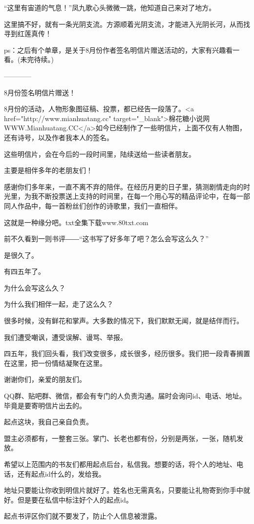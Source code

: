 \begin{this_body}
“这里有宙道的气息！”凤九歌心头微微一跳，他知道自己来对了地方。

这里搞不好，就有一条光阴支流。方源顺着光阴支流，才能进入光阴长河，从而找寻到红莲真传！

ps：之后有个单章，是关于8月份作者签名明信片赠送活动的，大家有兴趣看一看。(未完待续。)

------------

8月份签名明信片赠送！

8月份的活动，人物形象图征稿、投票，都已经告一段落了。<a href="http://www.mianhuatang.cc" target="\_blank">棉花糖小说网WWW.Mianhuatang.CC</a>如今已经制作了一些明信片，上面不仅有人物图，还有诗号，以及作者我本人的签名。

这些明信片，会在今后的一段时间里，陆续送给一些读者朋友。

主要是相伴多年的老朋友们！

感谢你们多年来，一直不离不弃的陪伴。在经历月更的日子里，猜测剧情走向的时光里，为我不断投票送上支持的时间里，在每一个用心写的精品评论中，在每一部同人作品中，每一首粉丝们创作的诗歌里，我们一直相伴。

这就是一种缘分吧。txt全集下载www.80txt.com

前不久看到一则书评――“这书写了好多年了吧？怎么会写这么久？”

是很久了。

有四五年了。

为什么会写这么久？

为什么我们相伴一起，走了这么久？

很多时候，没有鲜花和掌声。大多数的情况下，我们默默无闻，就是结伴而行。

我们遭受嘲讽，遭受误解、谩骂、举报。

四五年，我们回头看，我们改变很多，成长很多，经历很多。我们把一段青春搁置在这里，把一份情结凝聚在这里。

谢谢你们，亲爱的朋友们。

QQ群、贴吧群、微信，都会有专门的人负责沟通。届时会询问id、电话、地址。毕竟是要寄明信片出去的。

起点这块，我自己亲自负责。

盟主必须都有，一整套三张。掌门、长老也都有份，分别是两张，一张，随机发放。

希望以上范围内的书友们都用起点后台，私信我。想要的话，将个人的地址、电话，还有起点id什么的，发给我。

地址只要能让你收到明信片就好了。姓名也无需真名，只要能让礼物寄到你手中就好。但是要在私信中标注好个人的起点id。

起点书评区你们就不要发了，防止个人信息被泄露。


\end{this_body}
